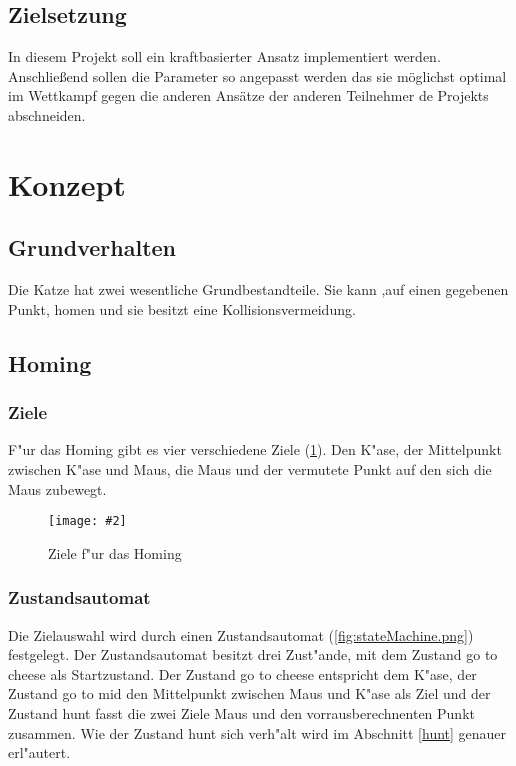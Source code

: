 \documentclass[
a4paper,     %
12pt         %
]{scrartcl}  %
\newcommand{\mygraphics}[3]{
\begin{figure}[!h]
  \begin{center}
    \texttt{[image: \#2]} \\
    \caption{#3}\label{fig:#2}
  \end{center}
\end{figure}

}
\begin{document}
\subsection{Zielsetzung}
In diesem Projekt soll ein kraftbasierter Ansatz implementiert werden. Anschließend sollen die Parameter so angepasst werden das sie möglichst optimal im Wettkampf gegen die anderen Ansätze der anderen Teilnehmer de Projekts abschneiden.
\clearpage

\section{Konzept}
\subsection{Grundverhalten}
Die Katze hat zwei wesentliche Grundbestandteile. Sie kann ,auf einen gegebenen Punkt, \glqq homen\grqq{} und sie besitzt eine Kollisionsvermeidung.
\subsection{Homing}
\subsubsection{Ziele}
F"ur das Homing gibt es vier verschiedene Ziele (\ref{fig:homingZiele.png}). Den K"ase, der Mittelpunkt zwischen K"ase und Maus, die Maus und der vermutete Punkt auf den sich die Maus zubewegt.
\mygraphics{0.7\textwidth}{homingZiele.png}{Ziele f"ur das Homing}
\clearpage
\subsubsection{Zustandsautomat}
Die Zielauswahl wird durch einen Zustandsautomat (\ref{fig:stateMachine.png}) festgelegt.
Der Zustandsautomat besitzt drei Zust"ande, mit dem Zustand \glqq go to cheese\grqq{} als Startzustand. Der Zustand \glqq go to cheese\grqq{} entspricht dem K"ase, der Zustand \glqq go to mid\grqq{} den Mittelpunkt zwischen Maus und K"ase als Ziel und der Zustand \glqq hunt\grqq{} fasst die zwei Ziele Maus und den vorrausberechnenten Punkt zusammen. Wie der Zustand \glqq hunt\grqq{} sich verh"alt wird im Abschnitt \ref{hunt} genauer erl"autert.\\
\hspace*{0.63\textwidth}
\end{document}
